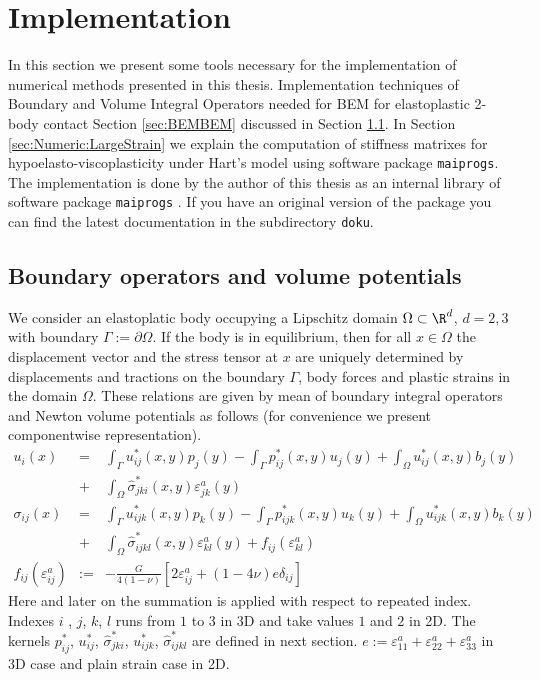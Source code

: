 \section{Implementation}
In this section we present some tools necessary for the implementation of  numerical methods presented in this thesis. Implementation techniques of Boundary and Volume Integral Operators needed for BEM for elastoplastic 2-body contact Section \ref{sec:BEMBEM} discussed in Section \ref{sec:Numeric:BEM:Operators}. In Section \ref{sec:Numeric:LargeStrain} we explain the computation of stiffness matrixes for hypoelasto-viscoplasticity under Hart's model using software package {\tt maiprogs}. The implementation is done by the author of this thesis as an  internal library   of software package {\tt maiprogs} \cite{Mai99prc,Mai96prd,Mai01a}. If you have an original version of the package you can find the latest documentation in the subdirectory \texttt{doku}.
\subsection{Boundary operators and volume potentials}\label{sec:Numeric:BEM:Operators}
We consider an elastoplatic body occupying a Lipschitz domain $\Omega\subset\R^{d}$, $d=2,3$ with boundary $\Gamma:=\partial \Omega$. If the body is in equilibrium, then for all $x\in\Omega$  the displacement vector and the stress tensor at $x$ are uniquely determined by displacements and tractions on the boundary $\Gamma$, body forces and plastic strains in the domain $\Omega$. These relations are given by mean of boundary integral operators and Newton volume potentials as follows (for convenience we present componentwise representation).
\begin{eqnarray}
u_i(x)&=&\int_{\Gamma}u^{*}_{ij}(x,y) p_j(y)-\int_{\Gamma}p^{*}_{ij}(x,y) u_j(y)+\int_{\Omega}u^{*}_{ij}(x,y)b_{j}(y)\nonumber \\ &+&\int_{\Omega}\hat{\sigma}^{*}_{jki}(x,y)\varepsilon^{a}_{jk}(y) \label{eq:RepresentationFormulaDisplacement}\\
\sigma_{ij}(x)&=&\int_{\Gamma}u^{*}_{ijk}(x,y) p_k(y)-\int_{\Gamma}p^{*}_{ijk}(x,y) u_k(y)+\int_{\Omega}u^{*}_{ijk}(x,y)b_{k}(y)\nonumber \\
&+&\int_{\Omega}\hat{\sigma}^{*}_{ijkl}(x,y)\varepsilon^{a}_{kl}(y)+f_{ij}(\varepsilon^{a}_{kl}) \label{eq:RepresentationFormulaStress}\\
f_{ij}(\varepsilon^{a}_{ij})&:=&-\frac{G}{4(1-\nu)}[2\varepsilon^{a}_{ij}+(1-4\nu)e\delta_{ij}]
\end{eqnarray}
Here and later on the summation is applied with respect to repeated index. Indexes $i$ , $j$, $k$, $l$ runs from $1$ to $3$ in 3D and take values $1$ and $2$ in 2D. The kernels $p^{*}_{ij}$, $u^{*}_{ij}$, $\hat{\sigma}^{*}_{jki}$, $u^{*}_{ijk}$,  $\hat{\sigma}^{*}_{ijkl}$ are defined in next section. $e:=\varepsilon^{a}_{11}+\varepsilon^{a}_{22}+\varepsilon^{a}_{33}$ in 3D case and plain strain case in 2D.
